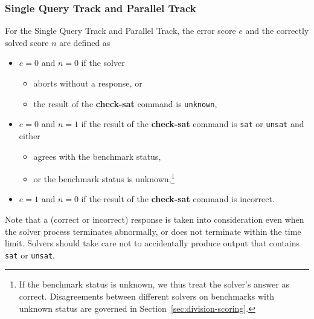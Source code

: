 \documentclass[12pt]{article}
\newcommand{\akey}[1]{\textbf{#1}\xspace}
\newcommand{\maintrack}{Single Query Track\xspace}
\newcommand{\paralleltrack}{Parallel Track\xspace}
\begin{document}
\subsubsection{\maintrack and \paralleltrack}
  For the \maintrack and \paralleltrack, the error score
  $e$ and the correctly solved score $n$ are defined as
  \begin{itemize}
  \item $e=0$ and $n=0$ if the solver
    \begin{itemize}[noitemsep,nolistsep]
      \item aborts without a response, or
      \item  the result of the \akey{check-sat} command is \texttt{unknown},
    \end{itemize}
  \item $e=0$ and $n=1$ if the result of the \akey{check-sat} command is
      \texttt{sat} or \texttt{unsat} and either
    \begin{itemize}[noitemsep,nolistsep]
      \item agrees with the benchmark status,
      \item or the benchmark status
        is unknown,\footnote{If the benchmark status is unknown, we thus treat
        the solver's answer as correct.  Disagreements between different
        solvers on benchmarks with unknown status are governed in
        Section~\ref{sec:division-scoring}.}
    \end{itemize}
  \item $e=1$ and $n=0$ if the result of the \akey{check-sat} command is
    incorrect.
  \end{itemize}
%
Note that a (correct or incorrect) response is taken into
consideration even when the solver process terminates abnormally, or
does not terminate within the time limit.  Solvers should take care
not to accidentally produce output that contains \texttt{sat} or
\texttt{unsat}.
\end{document}
